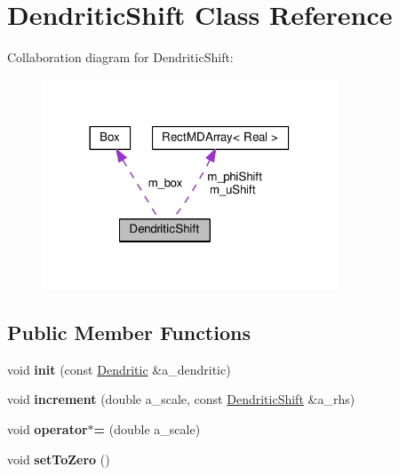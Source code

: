 \hypertarget{classDendriticShift}{}\section{Dendritic\+Shift Class Reference}
\label{classDendriticShift}


Collaboration diagram for Dendritic\+Shift\+:\nopagebreak
\begin{figure}[H]
\begin{center}
\leavevmode
\includegraphics[width=248pt]{classDendriticShift__coll__graph}
\end{center}
\end{figure}
\subsection*{Public Member Functions}
\begin{DoxyCompactItemize}
\item 
\hypertarget{classDendriticShift_adee89364f91a569e90602b6c40ecd9f0}{}void {\bfseries init} (const \hyperlink{classDendritic}{Dendritic} \&a\+\_\+dendritic)\label{classDendriticShift_adee89364f91a569e90602b6c40ecd9f0}

\item 
\hypertarget{classDendriticShift_a4eeae0e689cf4fa7c5cdacfd2420d260}{}void {\bfseries increment} (double a\+\_\+scale, const \hyperlink{classDendriticShift}{Dendritic\+Shift} \&a\+\_\+rhs)\label{classDendriticShift_a4eeae0e689cf4fa7c5cdacfd2420d260}

\item 
\hypertarget{classDendriticShift_ab97d5c358ddafa3ff7fb6d13cdc3521a}{}void {\bfseries operator$\ast$=} (double a\+\_\+scale)\label{classDendriticShift_ab97d5c358ddafa3ff7fb6d13cdc3521a}

\item 
\hypertarget{classDendriticShift_aa195e2e73dffff676d52bcf39c367cdb}{}void {\bfseries set\+To\+Zero} ()\label{classDendriticShift_aa195e2e73dffff676d52bcf39c367cdb}

\end{DoxyCompactItemize}
